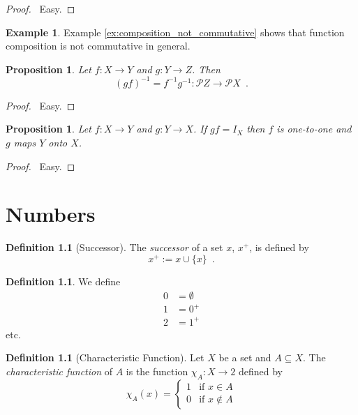 \documentclass{report}
\let\qed\relax
\newtheorem{prop}[ax]{Proposition}
\theoremstyle{definition}
\newtheorem{df}[ax]{Definition}
\newtheorem{ex}[ax]{Example}
\begin{document}
\begin{proof}
\pf\ Easy. \qed
\end{proof}

\begin{ex}
Example \ref{ex:composition_not_commutative} shows that function composition is not commutative in general.
\end{ex}

\begin{prop}
Let $f : X \rightarrow Y$ and $g : Y \rightarrow Z$. Then
\[ (gf)^{-1} = f^{-1}g^{-1} : \mathcal{P} Z \rightarrow \mathcal{P} X \enspace . \]
\end{prop}

\begin{proof}
\pf\ Easy. \qed
\end{proof}

\begin{prop}
Let $f : X \rightarrow Y$ and $g : Y \rightarrow X$. If $gf = I_X$ then $f$ is one-to-one and $g$ maps $Y$ onto $X$.
\end{prop}

\begin{proof}
\pf\ Easy. \qed
\end{proof}

\chapter{Numbers}

\begin{df}[Successor]
The \emph{successor} of a set $x$, $x^+$, is defined by
\[ x^+ := x \cup \{x\} \enspace . \]
\end{df}

\begin{df}
We define
\begin{align*}
0 & = \emptyset \\
1 & = 0^+ \\
2 & = 1^+
\end{align*}
etc.
\end{df}

\begin{df}[Characteristic Function]
Let $X$ be a set and $A \subseteq X$. The \emph{characteristic function} of $A$ is the function $\chi_A : X \rightarrow 2$ defined by
\[ \chi_A(x) = \begin{cases}
1 & \text{if } x \in A \\
0 & \text{if } x \notin A
\end{cases} \]
\end{df}
\end{document}
